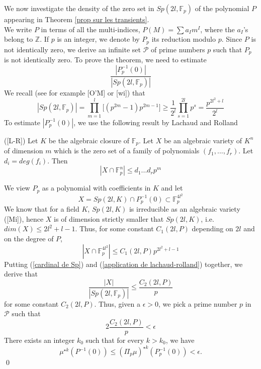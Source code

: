\documentclass[12pt]{article}
\begin{document}
We now investigate the density of the zero set in $Sp(2l, \mathbb{F}_p)$ of the polynomial  $P$ appearing in Theorem \ref{prop sur les transients}.\\
We write $P$ in terms of all the multi-indices, $P(M)=\sum a_I m^I$, where the $a_I$'s belong to $\mathbb{Z}$. If $p$ is an integer, we denote by $P_p$ its reduction modulo $p$. Since $P$ is not identically zero, we derive an infinite set $\mathcal P$ of prime numbers $p$ such that $P_p$ is not identically zero.  To prove the theorem, we need to estimate
\begin{equation}
\frac{|P_p^{-1}(0)|}{|Sp(2l, \mathbb{F}_p)|}
\end{equation}
We recall (see for example [O'M] or [wi]) that 
\begin{equation}\label{cardinal de Sp}
|Sp(2l,\mathbb{F}_p)|=\prod_{m=1}^l\big[(p^{2m}-1)p^{2m-1}\big]\geq \frac{1}{2^{l}}\prod_{s=1}^{2l}p^{s}
= \dfrac{p^{2l^2+l}}{2^{l}}
\end{equation}
To estimate $|P_p^{-1}(0)|$, we use the following result by Lachaud and Rolland 
\begin{thm}
	([L-R]) Let $K$ be the algebraic closure of $\mathbb{F}_p$. Let $X$ be an algebraic variety of $K^n$ of dimension $m$ which is the zero set of a family of polynomials $(f_1,...,f_r)$. Let $d_i=deg(f_i)$. Then 
	$$|X\cap \mathbb{F}_p^n|\leq d_1...d_rp^m$$
\end{thm}
We view $P_p$ as a polynomial with coefficients in $K$ and let 
\begin{equation}
X=Sp(2l,K)\cap P_p^{-1}(0)\subset \mathbb{F}_p^{4l^2}
\end{equation} We know that for a field $K$, $Sp(2l,K)$ is irreducible as an algebraic variety ([Mi]), hence $X$ is of dimension strictly smaller that $Sp(2l,K)$, i.e. $dim(X)\leq 2l^2+l-1$.  Thus, for some constant $C_1(2l,P)$ depending on $2l$ and on the degree of $P$,
\begin{equation}\label{application de lachaud-rolland}
|X\cap \mathbb{F}_p^{4l^2}|\leq C_1(2l,P) p^{2l^2+l-1}
\end{equation} 
Putting (\ref{cardinal de Sp}) and (\ref{application de lachaud-rolland}) together, we derive that  
\begin{equation}\label{estimee de conclusion}
\dfrac{|X|}{|Sp(2l, \mathbb{F}_p)|}\leq \dfrac{C_2(2l,P)}{p}
\end{equation}
for some constant $C_2(2l,P)$. Thus, given a $\epsilon>0$, we pick a prime number $p$ in $\mathcal P$ such that 
\begin{equation}
2\dfrac{C_2(2l,P)}{p}<\epsilon
\end{equation}
There exists an integer $k_0$ such that for every $k>k_0$, we have $$\mu^{\star k}(P^{-1}(0))\leq (\Pi_p\mu)^{\star k}(P_p^{-1}(0))<\epsilon.$$ 
\qed
\end{document}
